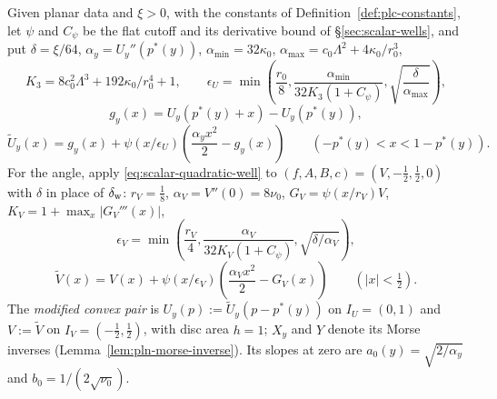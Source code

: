 \begin{definition}\label{def:plc-data}
Given planar data and $\xi>0$, with the constants of Definition~\ref{def:plc-constants}, let $\psi$ and $C_\psi$ be the
flat cutoff and its derivative bound of \S\ref{sec:scalar-wells}, and put $\delta=\xi/64$,
$\alpha_y=U_y''(p^*(y))$, $\alpha_{\min}=32\kappa_0$, $\alpha_{\max}=c_0\Lambda^2+4\kappa_0/r_0^3$,
\[
 K_3=8c_0^2\Lambda^3+192\kappa_0/r_0^4+1,\qquad
 \epsilon_U=\min\left(\frac{r_0}8,
 \frac{\alpha_{\min}}{32K_3(1+C_\psi)},\sqrt{\frac\delta{\alpha_{\max}}}\right),
\]
\[
 g_y(x)=U_y(p^*(y)+x)-U_y(p^*(y)),\]\[
 \widetilde U_y(x)=g_y(x)+\psi(x/\epsilon_U)
       \left(\frac{\alpha_yx^2}2-g_y(x)\right)\qquad(-p^*(y)<x<1-p^*(y)).
\]
For the angle, apply \eqref{eq:scalar-quadratic-well} to $(f,A,B,c)=(V,-\frac12,\frac12,0)$ with $\delta$ in place of
$\delta_{\rm w}$: $r_V=\frac18$, $\alpha_V=V''(0)=8\nu_0$, $G_V=\psi(x/r_V)V$, $K_V=1+\max_x|G_V'''(x)|$,
\[
 \epsilon_V=\min\left(\frac{r_V}4,
 \frac{\alpha_V}{32K_V(1+C_\psi)},\sqrt{\delta/\alpha_V}\right),\]\[
 \widetilde V(x)=V(x)+\psi(x/\epsilon_V)
       \left(\frac{\alpha_Vx^2}2-G_V(x)\right)\qquad(|x|<\tfrac12).
\]
The \emph{modified convex pair} is $U_y(p):=\widetilde U_y(p-p^*(y))$ on $I_U=(0,1)$ and $V:=\widetilde V$ on
$I_V=(-\frac12,\frac12)$, with disc area $h=1$; $X_y$ and $Y$ denote its Morse inverses
(Lemma~\ref{lem:pln-morse-inverse}). Its slopes at zero are $a_0(y)=\sqrt{2/\alpha_y}$ and $b_0=1/(2\sqrt{\nu_0})$.


\end{definition}
